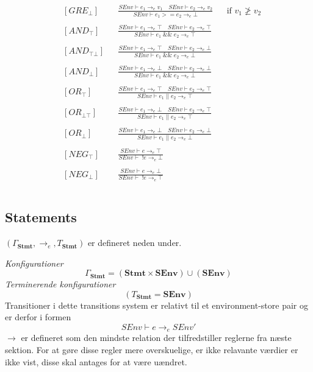 \begin{align*}
&[GRE_\bot] & &\frac{SEnv \vdash e_1 \rightarrow_e v_1 \quad SEnv \vdash e_2 \rightarrow_e v_2}{SEnv \vdash e_1 >= e_2 \rightarrow_e \bot} & &\text{if } v_1 \ngeq v_2\\\\
&[AND_\top] & &\frac{SEnv \vdash e_1 \rightarrow_e \top \quad SEnv \vdash e_2 \rightarrow_e \top}{SEnv \vdash e_1\; \&\&\; e_2 \rightarrow_e \top}\\\\
&[AND_{\top\bot}] & &\frac{SEnv \vdash e_1 \rightarrow_e \top \quad SEnv \vdash e_2 \rightarrow_e \bot}{SEnv \vdash e_1\; \&\&\; e_2 \rightarrow_e \bot}\\\\
&[AND_\bot] & &\frac{SEnv \vdash e_1 \rightarrow_e \bot \quad SEnv \vdash e_2 \rightarrow_e \bot}{SEnv \vdash e_1\; \&\&\; e_2 \rightarrow_e \bot}\\\\
&[OR_{\top}] & &\frac{SEnv \vdash e_1 \rightarrow_e \top \quad SEnv \vdash e_2 \rightarrow_e \top}{SEnv \vdash e_1\; ||\; e_2 \rightarrow_e \top}\\\\
&[OR_{\bot\top}] & &\frac{SEnv \vdash e_1 \rightarrow_e \bot \quad SEnv \vdash e_2 \rightarrow_e \top}{SEnv \vdash e_1\; ||\; e_2 \rightarrow_e \top}\\\\
&[OR_{\bot}] & &\frac{SEnv \vdash e_1 \rightarrow_e \bot \quad SEnv \vdash e_2 \rightarrow_e \bot}{SEnv \vdash e_1\; ||\; e_2 \rightarrow_e \bot}\\\\
&[NEG_\top] & &\frac{SEnv \vdash e \rightarrow_e \top}{SEnv \vdash\; !e \rightarrow_e \bot}\\\\
&[NEG_\bot] & &\frac{SEnv \vdash e \rightarrow_e \bot}{SEnv \vdash\; !e \rightarrow_e \top}\\\\
\end{align*}

\tocless \subsection{Statements}

$(\Gamma_\textbf{Stmt},\to_e,T_\textbf{Stmt})$ er defineret neden under.

\noindent \textit{Konfigurationer}
\[
    \Gamma_\textbf{Stmt} = (\textbf{Stmt}\times\textbf{SEnv})\cup(\textbf{SEnv}) 
\]
\textit{Terminerende konfigurationer}
\[
    (T_\textbf{Stmt}=\textbf{SEnv})
\]
Transitioner i dette transitions system er relativt til et environment-store pair og er derfor i formen
\[
    SEnv \vdash e \to_e SEnv'
\]
$\to$ er defineret som den mindste relation der tilfredstiller reglerne fra næste sektion. For at gøre disse regler mere overskuelige, er ikke relavante værdier er ikke vist, disse skal antages for at være uændret.\\

